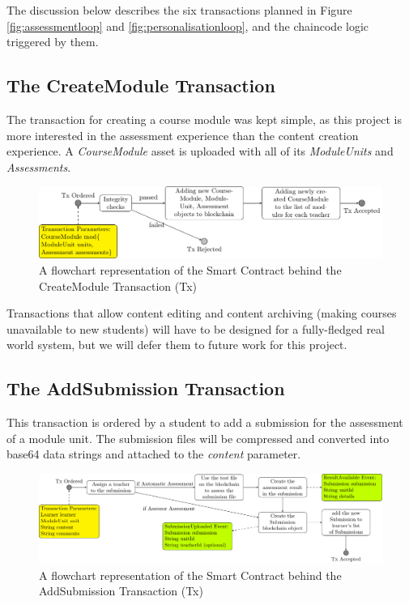 The discussion below describes the six transactions planned in Figure \ref{fig:assessmentloop} and \ref{fig:personalisationloop},
and the chaincode logic triggered by them.

\subsection{The CreateModule Transaction}

The transaction for creating a course module was kept simple, as this project is more interested in the assessment experience than the
content creation experience. A \textit{CourseModule} asset is uploaded with all of its \textit{ModuleUnits} and \textit{Assessments}.

\begin{figure}[!ht]
	\centering
	\includegraphics[width=1.0\textwidth]{cmtx}
	\caption{A flowchart representation of the Smart Contract behind the CreateModule Transaction (Tx)} \label{fig:cmtx}
\end{figure}

Transactions that allow content editing and content archiving (making courses unavailable to new students) will have to be designed
for a fully-fledged real world system, but we will defer them to future work for this project.

\subsection{The AddSubmission Transaction}

This transaction is ordered by a student to add a submission for the assessment of a module unit. The submission files will be
compressed and converted into base64 data strings and attached to the \textit{content} parameter.

\begin{figure}[!ht]
	\centering
	\includegraphics[width=1.0\textwidth]{astx}
	\caption{A flowchart representation of the Smart Contract behind the AddSubmission Transaction (Tx)} \label{fig:astx}
\end{figure}

